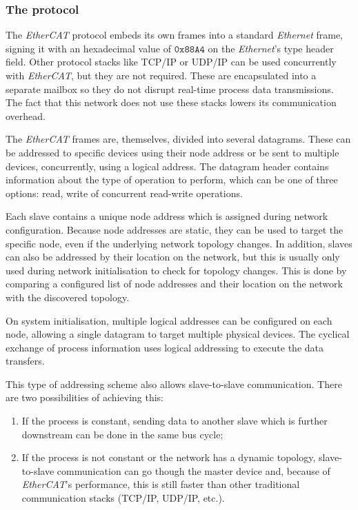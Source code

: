 \subsubsection{The protocol}

The \emph{EtherCAT} protocol embeds its own frames into a standard \emph{Ethernet} frame, signing it with an hexadecimal value of $\mathtt{0x88A4}$ on the \emph{Ethernet}'s type header field.
Other protocol stacks like TCP/IP or UDP/IP can be used concurrently with \emph{EtherCAT}, but they are not required.
These are encapsulated into a separate mailbox so they do not disrupt real-time process data transmissions.
The fact that this network does not use these stacks lowers its communication overhead.

The \emph{EtherCAT} frames are, themselves, divided into several datagrams.
These can be addressed to specific devices using their node address or be sent to multiple devices, concurrently, using a logical address.
The datagram header contains information about the type of operation to perform, which can be one of three options: read, write of concurrent read-write operations.

Each slave contains a unique node address which is assigned during network configuration.
Because node addresses are static, they can be used to target the specific node, even if the underlying network topology changes.
In addition, slaves can also be addressed by their location on the network, but this is usually only used during network initialisation to check for topology changes.
This is done by comparing a configured list of node addresses and their location on the network with the discovered topology.

On system initialisation, multiple logical addresses can be configured on each node, allowing a single datagram to target multiple physical devices.
The cyclical exchange of process information uses logical addressing to execute the data transfers.

This type of addressing scheme also allows slave-to-slave communication.
There are two possibilities of achieving this:
\begin{enumerate}
	\item If the process is constant, sending data to another slave which is further downstream can be done in the same bus cycle;
	\item If the process is not constant or the network has a dynamic topology, slave-to-slave communication can go though the master device and, because of \emph{EtherCAT}'s performance, this is still faster than other traditional communication stacks (TCP/IP, UDP/IP, etc.).
\end{enumerate}
